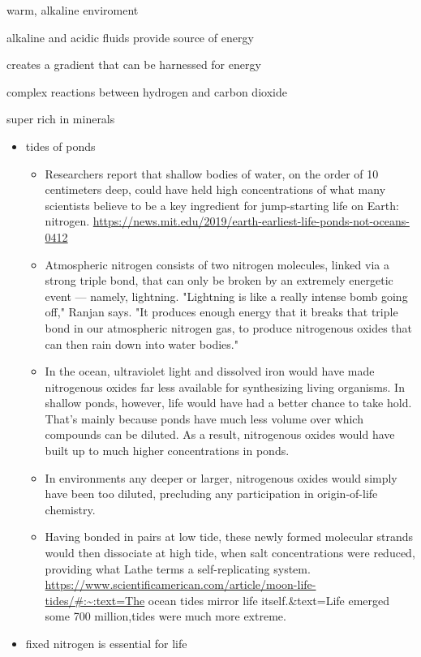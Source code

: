 \documentclass[letterpaper]{article}
\begin{document}
warm, alkaline enviroment

alkaline and acidic fluids provide source of energy

creates a gradient that can be harnessed for energy

complex reactions between hydrogen and carbon dioxide

super rich in minerals

\begin{itemize}
\item tides of ponds

\begin{itemize}
\item Researchers report that shallow bodies of water, on the order of 10
centimeters deep, could have held high concentrations of what many
scientists believe to be a key ingredient for jump-starting life on
Earth: nitrogen.
\url{https://news.mit.edu/2019/earth-earliest-life-ponds-not-oceans-0412}
\item Atmospheric nitrogen consists of two nitrogen molecules, linked via
a strong triple bond, that can only be broken by an extremely
energetic event --- namely, lightning. "Lightning is like a really
intense bomb going off," Ranjan says. "It produces enough energy
that it breaks that triple bond in our atmospheric nitrogen gas, to
produce nitrogenous oxides that can then rain down into water
bodies."
\item In the ocean, ultraviolet light and dissolved iron would have made
nitrogenous oxides far less available for synthesizing living
organisms. In shallow ponds, however, life would have had a better
chance to take hold. That's mainly because ponds have much less
volume over which compounds can be diluted. As a result, nitrogenous
oxides would have built up to much higher concentrations in ponds.
\item In environments any deeper or larger, nitrogenous oxides would
simply have been too diluted, precluding any participation in
origin-of-life chemistry.
\item{} Having bonded in pairs at low tide, these newly formed
molecular strands would then dissociate at high tide, when salt
concentrations were reduced, providing what Lathe terms a
self-replicating system.
\url{https://www.scientificamerican.com/article/moon-life-tides/\#:\~:text=The}
ocean tides mirror life itself.\&text=Life emerged some 700
million,tides were much more extreme.
\end{itemize}

\item fixed nitrogen is essential for life


\end{itemize}
\end{document}
